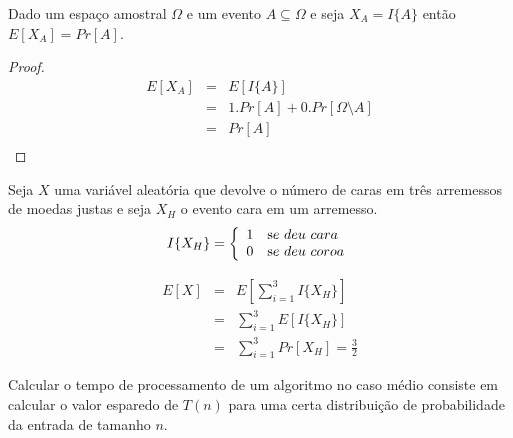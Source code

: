 \begin{lemma}
  Dado um espaço amostral $\Omega$ e um evento $A \subseteq \Omega$ e seja $X_A = I\{A\}$ então $E[X_A] = Pr[A]$.
\end{lemma}
\begin{proof}
  \begin{eqnarray*}
    E[X_A] & = & E[I\{A\}]\\
    & = & 1.Pr[A] + 0.Pr[\Omega \setminus A]\\
    & = & Pr[A] \\
  \end{eqnarray*}
\end{proof}

\begin{example}
  Seja $X$ uma variável aleatória que devolve o número de caras em três arremessos de moedas justas e seja $X_H$ o evento cara em um arremesso.
\begin{displaymath}
  I\{X_H\} = \left\{ \begin{array}{cl}
                   1 & {\textrm se\ deu\ cara}\\
                   0 & {\textrm se\ deu\ coroa}
                   \end{array}\right.
\end{displaymath}

\begin{eqnarray*}
  E[X] & = & E\left[\sum_{i=1}^3I\{X_H\}\right] \\
  & = & \sum_{i=1}^3E[I\{X_H\}]\\
  & = & \sum_{i=1}^3 Pr[X_H] = \frac{3}{2}
\end{eqnarray*}

\end{example}

Calcular o tempo de processamento de um algoritmo no caso médio consiste em calcular o valor esparedo de $T(n)$ para uma certa distribuição de probabilidade da entrada de tamanho $n$.

